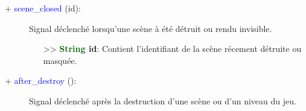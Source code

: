 \documentclass[a4paper, 11pt]{article}
\begin{document}
	\begin{description}
		\item [+ \textcolor{blue}{scene\_closed} (id):] Signal déclenché lorsqu'une scène à été détruit ou 
		rendu invisible.
		\begin{itemize}
			\item [>> \textbf{\textcolor{darkgreen}{String} id}:] Contient l'identifiant de la scène 
			récement détruite ou masquée.\\
		\end{itemize}
	\end{description}
	\begin{description}
		\item [+ \textcolor{blue}{after\_destroy} ():] Signal déclenché après la destruction d'une scène ou 
		d'un niveau du jeu.\\
	\end{description}
\end{document}
